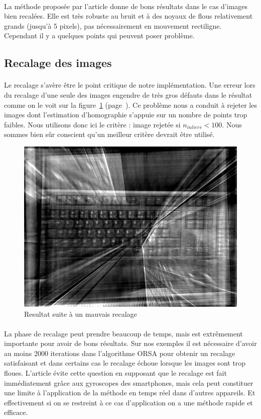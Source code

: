 \documentclass[a4paper,10pt]{report}
\begin{document}
\paragraph{}
La méthode proposée par l'article donne de bons résultats dans le cas d'images bien recalées. Elle est très 
robuste au bruit et à des noyaux de flous relativement grands (jusqu'à 5 pixels), pas nécessairement en
mouvement rectiligne. Cependant il y a quelques points qui peuvent poser problème.

\subsection{Recalage des images}

\paragraph{}
Le recalage s'avère être le point critique de notre implémentation. 
Une erreur lors du recalage d'une seule des images 
engendre de très gros défauts dans le résultat comme on le voit sur la 
figure~\ref{fig:mauvaisrecalage} (page~\pageref{fig:mauvaisrecalage}).
Ce problème nous a conduit à rejeter les images dont l'estimation d'homographie
s'appuie sur un nombre de points trop faibles. Nous utilisons donc ici le critère : 
image rejetée si \(n_{inliers} < 100\). 
Nous sommes bien sûr conscient qu'un meilleur critère devrait être utilisé. 

\begin{figure}[h]
\centering
\includegraphics[width=0.5\linewidth]{ressource/keyboardresultat.jpg} 
\caption{Resultat suite à un mauvais recalage}
\label{fig:mauvaisrecalage}
\end{figure}

\paragraph{}
La phase de recalage peut prendre beaucoup de temps, mais est extrêmement importante pour avoir de bons résultats.
Sur nos exemples il est nécessaire d'avoir au moins 2000 iterations dans l'algorithme ORSA pour obtenir un 
recalage satisfaisant et dans certains cas le recalage échoue lorsque les images sont trop floues.
L'article évite cette question en supposant que le recalage est fait immédiatement grâce aux gyroscopes
des smartphones, mais cela peut constituer une limite à l'application de la méthode en temps réel dans 
d'autres appareils. Et effectivement si on se restreint à ce cas d'application on a une méthode rapide et efficace.
\end{document}
